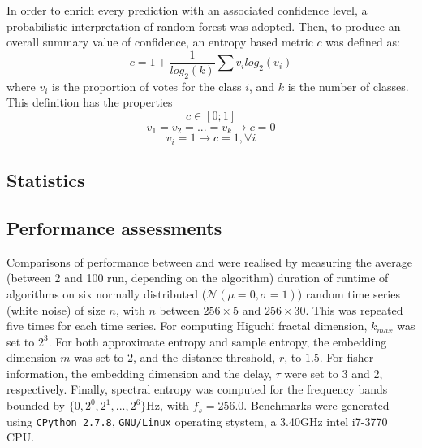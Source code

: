 In order to enrich every prediction with an associated confidence level, a probabilistic interpretation of random forest was adopted\citationneeded{}.
Then, to produce an overall summary value of confidence, an entropy based metric $c$ was defined as:
\begin{equation}
c = 1 + \frac{1}{log_2(k)}\sum{v_i  log_2(v_i)}
\label{eq:entropy}
\end{equation}
where $v_i$ is the proportion of votes for the class $i$, and $k$ is the number of classes. This definition has the properties 
\[
c \in [0;1]
\]
\[
v_1 = v_2 = ... = v_k \rightarrow c = 0
\]
\[
v_i = 1 \rightarrow c = 1 , \forall i
\]


\subsection{Statistics}


\subsection{Performance assessments}
Comparisons of performance between \pr{} and \pyeeg{} were realised by measuring the average (between 2 and 100 run, depending on the algorithm) duration of runtime of algorithms on six
normally distributed ($\mathcal{N}(\mu=0,\sigma=1)$) random time series (\ie white noise) of size $n$,
with $n$ between $256 \times{} 5$ and $256 \times{} 30$.
This was repeated five times for each time series.
For computing  Higuchi fractal dimension, $k_{max}$ was set to $2^3$.
For both approximate entropy and sample entropy, the embedding dimension $m$ was set to $2$, and the distance threshold, $r$, to $1.5$.
For fisher information, the embedding dimension and the delay, $\tau$ were set to $3$ and $2$, respectively.
Finally, spectral entropy was computed for the frequency bands bounded by $\{0, 2^0, 2^1, ..., 2^6\}$Hz, with $f_s = 256.0$.
Benchmarks were generated using \texttt{CPython 2.7.8}, \texttt{GNU/Linux} operating stystem, a 3.40GHz intel i7-3770 CPU.
